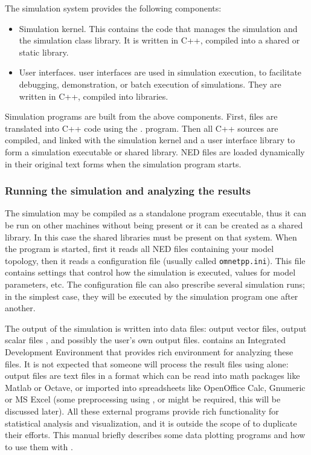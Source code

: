 The simulation system provides the following components:
\begin{itemize}
  \item{Simulation kernel. This contains the
    code that manages the simulation and the simulation class library.
    It is written in C++, compiled into a shared or static library.}
  \item{User interfaces.
     {\opp} user interfaces
    are used in simulation execution, to facilitate debugging,
    demonstration, or batch execution of simulations. They are 
    written in C++, compiled into libraries.}
\end{itemize}


Simulation programs are built from the above components. First,
 files are translated into C++ code using the .
program. Then all C++ sources are compiled, and linked with the simulation
kernel and a user interface library to form a simulation executable or
shared library. NED files are loaded dynamically in their original
text forms when the simulation program starts.



\subsubsection{Running the simulation and analyzing the results}

The simulation may be compiled as a standalone program executable,
thus it can be run on other machines without {\opp}
being present or it can be created as a shared library. In this case the
{\opp} shared libraries must be present on that system.
When the program is started, first it reads all NED files 
containing your model topology, then it reads a configuration
file (usually called
\texttt{omnetpp.ini}). This file contains settings that
control how the simulation is executed, values for model parameters, etc.
The configuration file can also prescribe several simulation runs; in
the simplest case, they will be executed by the simulation program one
after another.

The output of the simulation is written into data files: output vector
files, output scalar files
, and possibly the user's own output files.
{\opp} contains an Integrated Development Environment that provides 
rich environment for analyzing these files. It is not expected that someone will
process the result files using {\opp} alone: output files are text
files in a format which can be read into math packages like Matlab
or Octave, or imported into spreadsheets like OpenOffice Calc,
Gnumeric or MS Excel (some preprocessing using , 
or  might be required, this will be discussed later).
All these external programs provide rich functionality for statistical
analysis and visualization, and it is outside the scope of {\opp} to
duplicate their efforts. This manual briefly describes
some data plotting programs and how to use them with {\opp}.

